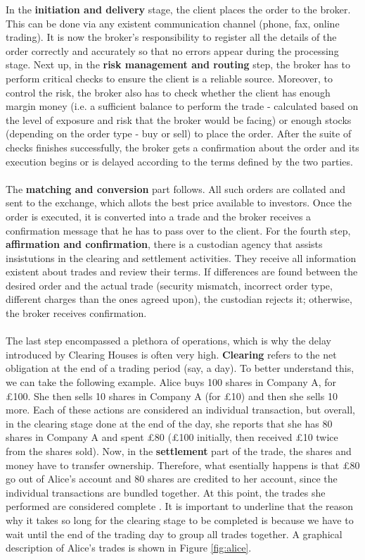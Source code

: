 \documentclass[12pt,twoside]{article}
\begin{document}
In the \textbf{initiation and delivery} stage, the client places the order to the broker. This can be done via any existent communication channel (phone, fax, online trading). It is now the broker's responsibility to register all the details of the order correctly and accurately so that no errors appear during the processing stage. Next up, in the \textbf{risk management and routing} step, the broker has to perform critical checks to ensure the client is a reliable source. Moreover, to control the risk, the broker also has to check whether the client has enough margin money (i.e. a sufficient balance to perform the trade - calculated based on the level of exposure and risk that the broker would be facing) or enough stocks (depending on the order type - buy or sell) to place the order. After the suite of checks finishes successfully, the broker gets a confirmation about the order and its execution begins or is delayed according to the terms defined by the two parties. 
\\ \\
The \textbf{matching and conversion} part follows. All such orders are collated and sent to the exchange, which allots the best price available to investors. Once the order is executed, it is converted into a trade and the broker receives a confirmation message that he has to pass over to the client. For the fourth step, \textbf{affirmation and confirmation}, there is a custodian agency that assists insistutions in the clearing and settlement activities. They receive all information existent about trades and review their terms. If differences are found between the desired order and the actual trade (security mismatch, incorrect order type, different charges than the ones agreed upon), the custodian rejects it; otherwise, the broker receives confirmation. 
\\ \\
The last step encompassed a plethora of operations, which is why the delay introduced by Clearing Houses is often very high. \textbf{Clearing} refers to the net obligation at the end of a trading period (say, a day). To better understand this, we can take the following example. Alice buys 100 shares in Company A, for \pounds 100. She then sells 10 shares in Company A (for \pounds 10) and then she sells 10 more. Each of these actions are considered an individual transaction, but overall, in the clearing stage done at the end of the day, she reports that she has 80 shares in Company A and spent \pounds 80 (\pounds 100 initially, then received \pounds 10 twice from the shares sold). Now, in the \textbf{settlement} part of the trade, the shares and money have to transfer ownership. Therefore, what esentially happens is that \pounds 80 go out of Alice's account and 80 shares are credited to her account, since the individual transactions are bundled together. At this point, the trades she performed are considered complete \cite{TradeCycle2}. It is important to underline that the reason why it takes so long for the clearing stage to be completed is because we have to wait until the end of the trading day to group all trades together. A graphical description of Alice's trades is shown in Figure \ref{fig:alice}.
\end{document}
